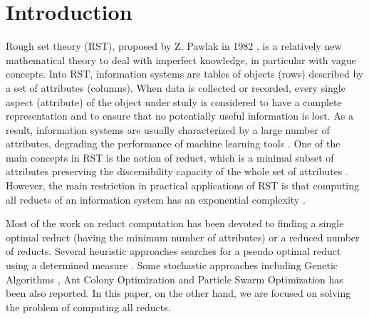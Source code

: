 \documentclass[authoryear,preprint,review,12pt]{elsarticle}
\begin{document}
\section{Introduction}
  Rough set theory (RST), proposed by Z. Pawlak in 1982 \citep{Pawlak81,Pawlak81-2,Pawlak82,Pawlak91}, 
  is a relatively new mathematical theory to deal with imperfect knowledge, in particular with vague 
  concepts. Into RST, information systems are tables of objects (rows) described by a set of attributes (columns). 
  When data is collected or recorded, every single aspect (attribute) of the object under study is considered 
  to have a complete representation and to ensure that no potentially useful information is lost.
  As a result, information systems are usually characterized by a large number of attributes,
  degrading the performance of machine learning tools \citep{Parthalain08}.
  One of the main concepts in RST is the notion of reduct, which is a minimal subset of attributes 
  preserving the discernibility capacity of the whole set of attributes \citep{Pawlak91}.  
  However, the main restriction in practical applications of RST is that computing all reducts of an information 
  system has an exponential complexity \citep{Skowron92}. 
  
  Most of the work on reduct computation has been devoted to finding a single optimal reduct (having the minimum 
  number of attributes) or a reduced number of reducts. Several heuristic approaches searches for a pseudo optimal
  reduct using a determined measure \citep{Chouchoulas01,Ohrn00}. Some stochastic approaches including Genetic
  Algorithms \citep{Wroblewski95}, Ant Colony Optimization \citep{Jensen03,Chen10} and Particle Swarm Optimization 
  \citep{Wang07} has been also reported. In this paper, on the other hand, we are focused on solving the problem
  of computing all reducts.
  
\end{document}
